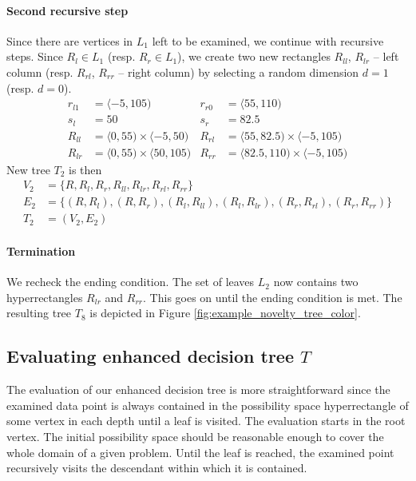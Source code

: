 \begin{example}
\paragraph{Second recursive step}
    Since there are vertices in $L_1$ left to be examined, we continue with recursive steps.
    Since $R_l \in L_1$ (resp. $R_r \in L_1$), we create two new rectangles $R_{ll}$, $R_{lr}$ -- left column (resp. $R_{rl}$, $R_{rr}$ -- right column) by selecting a random dimension $d=1$ (resp. $d=0$).
    \begin{align*}
        r_{l1} &= \langle -5, 105)& r_{r0} &= \langle 55, 110) \\
        s_l &= 50 & s_r&=82.5\\
        R_{ll} &= \langle 0, 55) \times \langle -5,50) & R_{rl} &= \langle 55, 82.5) \times \langle -5,105)\\
        R_{lr} &= \langle 0, 55) \times \langle 50,105) & R_{rr} &= \langle 82.5, 110) \times \langle -5,105)
    \end{align*}
 New tree $T_2$ is then
    \begin{align*}
        V_2 &= \{R, R_l, R_r, R_{ll}, R_{lr}, R_{rl}, R_{rr}\} \\
        E_2 &= \{(R, R_l), (R, R_r), (R_l, R_{ll}), (R_l, R_{lr}), (R_r, R_{rl}), (R_r, R_{rr})\} \\
        T_2 &= (V_2, E_2)
    \end{align*}
\paragraph{Termination} We recheck the ending condition. The set of leaves $L_2$ now contains two hyperrectangles $R_{lr}$ and $R_{rr}$.
This goes on until the ending condition is met. The resulting tree $T_8$ is depicted in Figure \ref{fig:example_novelty_tree_color}.
\end{example}

\subsection{Evaluating enhanced decision tree $T$}
The evaluation of our enhanced decision tree is more straightforward since the examined data point is always contained in the possibility space hyperrectangle of some vertex in each depth until a leaf is visited.
The evaluation starts in the root vertex. The initial possibility space should be reasonable enough to cover the whole domain of a given problem. Until the leaf is reached, the examined point recursively visits the descendant within which it is contained.



